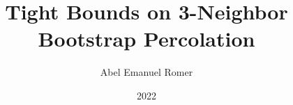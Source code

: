 \documentclass[12pt,oneside]{sigmasthesis}
\title{Tight Bounds on 3-Neighbor Bootstrap Percolation}			%
\author{Abel Emanuel Romer}			%
\date{2022}				%
\theoremstyle{definition}
\begin{document}
\frontmatter 	%


\makecommittee	%

\begin{abstract}
\end{abstract}

\newpage{}\tableofcontents %
\newpage{}\listoftables %
\newpage{}\listoffigures %

\begin{acknowledgements} 
	\baselineskip
	\noindent %
\end{acknowledgements}

\begin{dedication} 
	\baselineskip
	\noindent %
\end{dedication}
\mainmatter %
\end{document}
